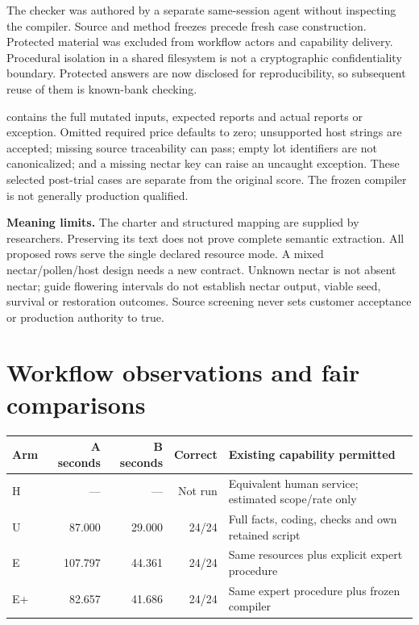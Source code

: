 \documentclass[10pt]{article}
\begin{document}
The checker was authored by a separate same-session agent without inspecting the compiler. Source and method freezes precede fresh case construction. Protected material was excluded from workflow actors and capability delivery. Procedural isolation in a shared filesystem is not a cryptographic confidentiality boundary. Protected answers are now disclosed for reproducibility, so subsequent reuse of them is known-bank checking.

\begin{boundary}[title=Five broader defects are observed]
 contains the full mutated inputs, expected reports and actual reports or exception. Omitted required price defaults to zero; unsupported host strings are accepted; missing source traceability can pass; empty lot identifiers are not canonicalized; and a missing nectar key can raise an uncaught exception. These selected post-trial cases are separate from the original score. The frozen compiler is not generally production qualified.
\end{boundary}

\textbf{Meaning limits.} The charter and structured mapping are supplied by researchers. Preserving its text does not prove complete semantic extraction. All proposed rows serve the single declared resource mode. A mixed nectar/pollen/host design needs a new contract. Unknown nectar is not absent nectar; guide flowering intervals do not establish nectar output, viable seed, survival or restoration outcomes. Source screening never sets customer acceptance or production authority to true.

\section{Workflow observations and fair comparisons}
\begin{tabularx}{\textwidth}{@{}lrrrY@{}}
\toprule
Arm & A seconds & B seconds & Correct & Existing capability permitted\\\midrule
H & --- & --- & Not run & Equivalent human service; estimated scope/rate only\\
U & 87.000 & 29.000 & 24/24 & Full facts, coding, checks and own retained script\\
E & 107.797 & 44.361 & 24/24 & Same resources plus explicit expert procedure\\
E+ & 82.657 & 41.686 & 24/24 & Same expert procedure plus frozen compiler\\
\bottomrule
\end{tabularx}
\end{document}
